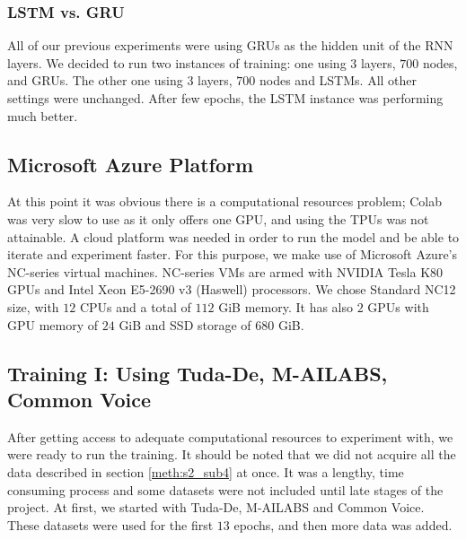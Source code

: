 \subsubsection{LSTM vs. GRU}
\label{meth:s4_sub1_subsub1}

All of our previous experiments were using \ac{GRU}s as the hidden unit of the \ac{RNN} layers. We decided to run two instances of training: one using $3$ layers, $700$ nodes, and \ac{GRU}s. The other one using $3$ layers, $700$ nodes and \ac{LSTM}s. All other settings were unchanged.
After few epochs, the \ac{LSTM} instance was performing much better.


\subsection{Microsoft Azure Platform}
\label{meth:s4_sub2}

At this point it was obvious there is a computational resources problem; Colab was very slow to use as it only offers one GPU, and using the \ac{TPU}s was not attainable. A cloud platform was needed in order to run the model and be able to iterate and experiment faster. For this purpose, we make use of Microsoft Azure's NC-series virtual machines. NC-series \ac{VM}s are armed with NVIDIA Tesla K80 GPUs and Intel Xeon E5-2690 v3 (Haswell) processors.
We chose Standard NC12 size, with $12$ CPUs and a total of $112$ GiB memory. It has also $2$ GPUs with GPU memory of $24$ GiB and SSD storage of $680$ GiB.



\subsection{Training I: Using Tuda-De, M-AILABS, Common Voice } 
\label{meth:s4_sub3}

After getting access to adequate computational resources to experiment with, we were ready to run the training. It should be noted that we did not acquire all the data described in section \ref{meth:s2_sub4} at once. It was a lengthy, time consuming process and some datasets were not included until late stages of the project. At first, we started with Tuda-De, M-AILABS and Common Voice. These datasets were used for the first $13$ epochs, and then more data was added.

